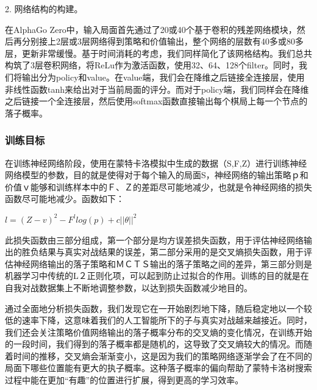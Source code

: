 \documentclass[a4paper]{article}
\begin{document}
\begin{multicols}{2}
2. 网络结构的构建。\par
在AlphaGo Zero中，输入局面首先通过了20或40个基于卷积的残差网络模块，然后再分别接上2层或3层网络得到策略和价值输出，整个网络的层数有40多或80多层，更新非常缓慢。\cite{AI2}基于时间消耗的考虑，我们同样简化了该网格结构。我们总共构筑了3层卷积网络，将ReLu作为激活函数，使用32、64、128个filter。同时，我们将输出分为policy和value。在value端，我们会在降维之后链接全连接层，使用非线性函数tanh来给出对于当前局面的评分。而对于policy端，我们同样会在降维之后链接一个全连接层，然后使用softmax函数直接输出每个棋局上每一个节点的落子概率。\par
\subsubsection{训练目标}
	在训练神经网络阶段，使用在蒙特卡洛模拟中生成的数据（S,F,Z）进行训练神经网络模型的参数，目的就是使得对于每个输入的局面S，神经网络的输出策略ｐ和价值ｖ能够和训练样本中的Ｆ、Ｚ的差距尽可能地减少，也就是令神经网络的损失函数尽可能地减少。函数如下：\par
$l=(Z-v)^{2}-F^{l}log(p)+c||\theta||^{2}$\par
此损失函数由三部分组成，第一个部分是均方误差损失函数，用于评估神经网络输出的胜负结果与真实对战结果的误差，第二部分采用的是交叉熵损失函数，用于评估神经网络输出的落子策略和ＭＣＴＳ输出的落子策略之间的差异，第三部分则是机器学习中传统的L２正则化项，可以起到防止过拟合的作用。训练的目的就是在自我对战数据集上不断地调整参数，以达到损失函数减少地目的。\cite{k9}\par
通过全面地分析损失函数，我们发现它在一开始剧烈地下降，随后稳定地以一个较低的速率下降，这意味着我们的人工智能所下的子与真实对战越来越接近。同时，我们还会关注策略价值网络输出的落子概率分布的交叉熵的变化情况，在训练开始的一段时间，我们得到的落子概率都是随机的，这导致了交叉熵较大的情况。而随着时间的推移，交叉熵会渐渐变小，这是因为我们的策略网络逐渐学会了在不同的局面下哪些位置能有更大的执子概率。这种落子概率的偏向帮助了蒙特卡洛树搜索过程中能在更加“有趣”的位置进行扩展，得到更高的学习效率。\par

\end{multicols}
\end{document}
